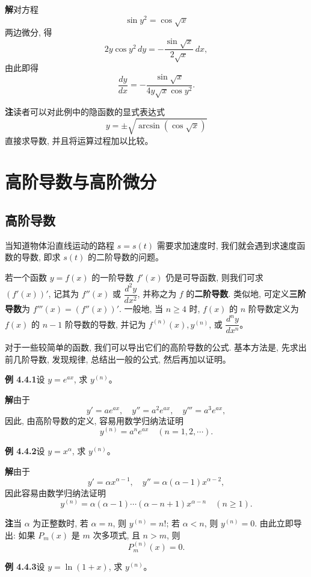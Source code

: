 \documentclass[UTF8,12pt,a4paper,fontset=fandol]{ctexart}
\begin{document}
\noindent\textbf{解}\quad 对方程
\[
  \sin y^2=\cos\sqrt{x}
\]
两边微分, 得
\[
  2y\cos y^2\,dy
  =
  -\frac{\sin\sqrt{x}}{2\sqrt{x}}\,dx,
\]
由此即得
\[
  \frac{dy}{dx}
  =
  -\frac{\sin\sqrt{x}}{4y\sqrt{x}\cos y^2}.
\]

\noindent\textbf{注}\quad 读者可以对此例中的隐函数的显式表达式
\[
  y=\pm\sqrt{\arcsin(\cos\sqrt{x})}
\]
直接求导数, 并且将运算过程加以比较。

\section{高阶导数与高阶微分}

\subsection{高阶导数}

当知道物体沿直线运动的路程 $s=s(t)$ 需要求加速度时, 我们就会遇到求速度函数的导数, 即求 $s(t)$ 的二阶导数的问题。

若一个函数 $y=f(x)$ 的一阶导数 $f'(x)$ 仍是可导函数, 则我们可求 $(f'(x))'$, 记其为 $f''(x)$ 或 $\dfrac{d^2y}{dx^2}$, 并称之为 $f$ 的\textbf{二阶导数}. 类似地, 可定义\textbf{三阶导数}为 $f'''(x)=(f''(x))'$. 一般地, 当 $n\geqslant4$ 时, $f(x)$ 的 $n$ 阶导数定义为 $f(x)$ 的 $n-1$ 阶导数的导数, 并记为 $f^{(n)}(x),y^{(n)}$, 或 $\dfrac{d^ny}{dx^n}$。

对于一些较简单的函数, 我们可以导出它们的高阶导数的公式. 基本方法是, 先求出前几阶导数, 发现规律, 总结出一般的公式, 然后再加以证明。

\noindent\textbf{例 4.4.1}\quad 设 $y=e^{ax}$, 求 $y^{(n)}$。

\noindent\textbf{解}\quad 由于
\[
  y'=ae^{ax},\quad y''=a^2e^{ax},\quad y'''=a^3e^{ax},
\]
因此, 由高阶导数的定义, 容易用数学归纳法证明
\[
  y^{(n)}=a^ne^{ax}\quad(n=1,2,\cdots).
\]

\noindent\textbf{例 4.4.2}\quad 设 $y=x^\alpha$, 求 $y^{(n)}$。

\noindent\textbf{解}\quad 由于
\[
  y'=\alpha x^{\alpha-1},\quad y''=\alpha(\alpha-1)x^{\alpha-2},
\]
因此容易由数学归纳法证明
\[
  y^{(n)}
  =
  \alpha(\alpha-1)\cdots(\alpha-n+1)x^{\alpha-n}
  \quad(n\geqslant1).
\]

\noindent\textbf{注}\quad 当 $\alpha$ 为正整数时, 若 $\alpha=n$, 则 $y^{(n)}=n!$; 若 $\alpha<n$, 则 $y^{(n)}=0$. 由此立即导出: 如果 $P_m(x)$ 是 $m$ 次多项式, 且 $n>m$, 则
\[
  P_m^{(n)}(x)=0.
\]

\noindent\textbf{例 4.4.3}\quad 设 $y=\ln(1+x)$, 求 $y^{(n)}$。
\end{document}
